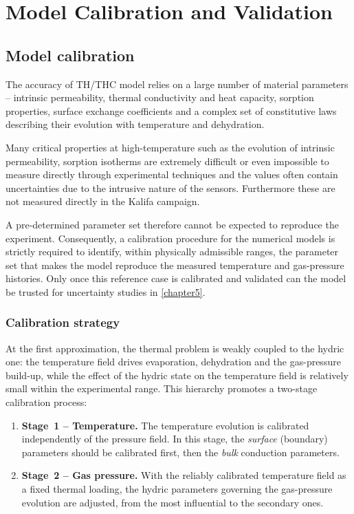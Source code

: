 \chapter{Model Calibration and Validation} \label{chapter4} %

\section{Model calibration} \label{sec:calibration}

The accuracy of TH/THC model relies on a large number of material parameters -- intrinsic permeability, thermal conductivity and heat capacity, sorption properties, surface exchange coefficients and a complex set of constitutive laws describing their evolution with temperature and dehydration.

Many critical properties at high-temperature such as the evolution of intrinsic permeability, sorption isotherms are extremely difficult or even impossible to measure directly through experimental techniques and the values often contain uncertainties due to the intrusive nature of the sensors. Furthermore these are not measured directly in the Kalifa campaign.

A pre-determined parameter set therefore cannot be expected to reproduce the experiment. Consequently, a calibration procedure for the numerical models is strictly required to identify, within physically admissible ranges, the parameter set that makes the model reproduce the measured temperature and gas-pressure histories. Only once this reference case is calibrated and validated can the model be trusted for uncertainty studies in \cref{chapter5}.

\subsection{Calibration strategy} \label{sec:cal-strategy}
At the first approximation, the thermal problem is weakly coupled to the hydric one: the temperature field drives evaporation, dehydration and the gas-pressure build-up, while the effect of the hydric state on the temperature field is relatively small within the experimental range. This hierarchy promotes a two-stage calibration process:

\begin{enumerate}
  \item \textbf{Stage~1 -- Temperature.} The temperature evolution is calibrated independently of the pressure field. In this stage, the \emph{surface} (boundary) parameters should be calibrated first, then the \emph{bulk} conduction parameters.
  \item \textbf{Stage~2 -- Gas pressure.} With the reliably calibrated temperature field as a fixed thermal loading, the hydric parameters governing the gas-pressure evolution are adjusted, from the most influential to the secondary ones.
\end{enumerate}

